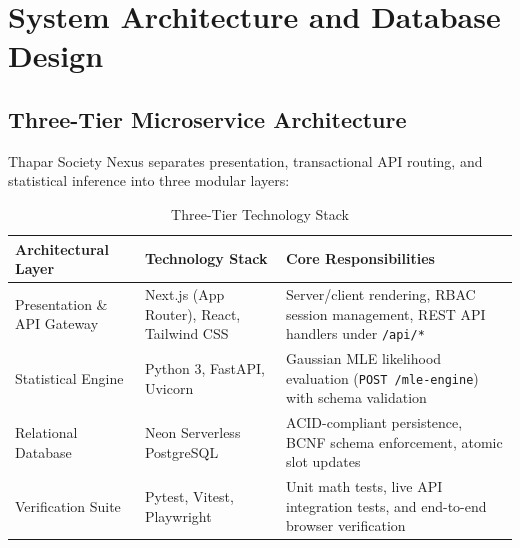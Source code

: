 \documentclass[12pt,a4paper]{report}
\begin{document}
\chapter{System Architecture and Database Design}

\section{Three-Tier Microservice Architecture}
Thapar Society Nexus separates presentation, transactional API routing, and statistical inference into three modular layers:

\begin{table}[H]
\centering
\renewcommand{\arraystretch}{1.25}
\begin{tabularx}{\textwidth}{@{}l l X@{}}
\toprule
\textbf{Architectural Layer} & \textbf{Technology Stack} & \textbf{Core Responsibilities} \\
\midrule
Presentation \& API Gateway & Next.js (App Router), React, Tailwind CSS & Server/client rendering, RBAC session management, REST API handlers under \texttt{/api/*} \\
Statistical Engine & Python 3, FastAPI, Uvicorn & Gaussian MLE likelihood evaluation (\texttt{POST /mle-engine}) with schema validation \\
Relational Database & Neon Serverless PostgreSQL & ACID-compliant persistence, BCNF schema enforcement, atomic slot updates \\
Verification Suite & Pytest, Vitest, Playwright & Unit math tests, live API integration tests, and end-to-end browser verification \\
\bottomrule
\end{tabularx}
\caption{Three-Tier Technology Stack}
\end{table}
\end{document}
